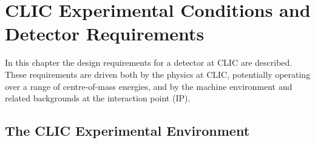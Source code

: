 \chapter{CLIC Experimental Conditions and Detector Requirements\label{chapter_03}}


In this chapter the design requirements for a detector at CLIC are described.
These requirements are driven both by the physics at CLIC, potentially operating
over a range of centre-of-mass energies, and by the machine environment and
related backgrounds at the interaction point (IP). 


\section{The CLIC Experimental Environment\label{sec:chapter3:environment}}

